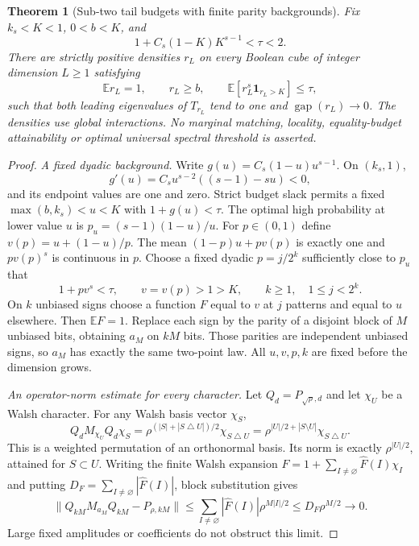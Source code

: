 \documentclass[11pt]{article}
\newtheorem{theorem}{Theorem}
\newcommand{\gap}{\operatorname{gap}}
\begin{document}
\begin{theorem}[Sub-two tail budgets with finite parity backgrounds]
\label{thm:background-collapse}
Fix $k_s<K<1$, $0<b<K$, and
\[
 1+C_s(1-K)K^{s-1}<\tau<2.
\]
There are strictly positive densities $r_L$ on every Boolean cube
of integer dimension $L\ge1$ satisfying
\[
 \mathbb E r_L=1,\qquad r_L\ge b,\qquad
 \mathbb E[r_L^s\mathbf1_{r_L>K}]\le\tau,
\]
such that both leading eigenvalues of $T_{r_L}$ tend to one and
$\gap(r_L)\to0$. The densities use global interactions. No marginal
matching, locality, equality-budget attainability or optimal universal
spectral threshold is asserted.
\end{theorem}
\begin{proof}
\emph{A fixed dyadic background.}
Write $g(u)=C_s(1-u)u^{s-1}$. On $(k_s,1)$,
\[
 g'(u)=C_su^{s-2}((s-1)-su)<0,
\]
and its endpoint values are one and zero. Strict budget slack permits
a fixed $\max(b,k_s)<u<K$ with $1+g(u)<\tau$. The optimal high
probability at lower value $u$ is $p_u=(s-1)(1-u)/u$.
For $p\in(0,1)$ define $v(p)=u+(1-u)/p$. The mean
$(1-p)u+pv(p)$ is exactly one and $pv(p)^s$ is continuous in $p$.
Choose a fixed dyadic $p=j/2^k$ sufficiently close to $p_u$ that
\[
 1+pv^s<\tau,\qquad v=v(p)>1>K,
 \qquad k\ge1,\quad 1\le j<2^k.
\]
On $k$ unbiased signs choose a function $F$ equal to $v$ at $j$
patterns and equal to $u$ elsewhere. Then $\mathbb EF=1$.
Replace each sign by the parity of a disjoint block of $M$ unbiased
bits, obtaining $a_M$ on $kM$ bits. Those parities are independent
unbiased signs, so $a_M$ has exactly the same two-point law.
All $u,v,p,k$ are fixed before the dimension grows.

\emph{An operator-norm estimate for every character.}
Let $Q_d=P_{\sqrt\rho,d}$ and let $\chi_U$ be a Walsh character.
For any Walsh basis vector $\chi_S$,
\[
 Q_dM_{\chi_U}Q_d\chi_S
 =\rho^{(|S|+|S\mathbin\triangle U|)/2}\chi_{S\mathbin\triangle U}
 =\rho^{|U|/2+|S\setminus U|}\chi_{S\mathbin\triangle U}.
\]
This is a weighted permutation of an orthonormal basis. Its norm is
exactly $\rho^{|U|/2}$, attained for $S\subset U$.
Writing the finite Walsh expansion
$F=1+\sum_{I\ne\varnothing}\widehat F(I)\chi_I$ and putting
$D_F=\sum_{I\ne\varnothing}|\widehat F(I)|$, block substitution gives
\begin{equation}\label{eq:318-background-decay}
 \|Q_{kM}M_{a_M}Q_{kM}-P_{\rho,kM}\|
 \le \sum_{I\ne\varnothing}|\widehat F(I)|\rho^{M|I|/2}
 \le D_F\rho^{M/2}\longrightarrow0.
\end{equation}
Large fixed amplitudes or coefficients do not obstruct this limit.


\end{proof}
\end{document}
